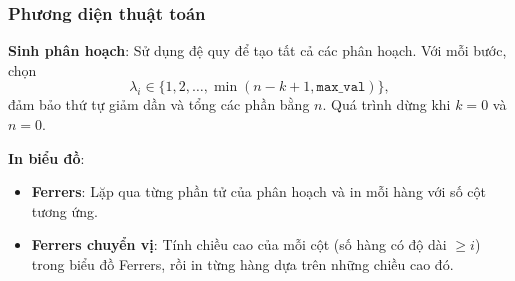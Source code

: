 \documentclass[a4paper,12pt]{article}
\begin{document}
\subsubsection{Phương diện thuật toán}
\textbf{Sinh phân hoạch}: Sử dụng đệ quy để tạo tất cả các phân hoạch. Với mỗi bước, chọn 
\[
  \lambda_i \in \{1, 2, \dots, \min(n - k + 1, \mathtt{max\_val})\},
\]
đảm bảo thứ tự giảm dần và tổng các phần bằng \(n\). Quá trình dừng khi \(k = 0\) và \(n = 0\).

\bigskip
\textbf{In biểu đồ}:
\begin{itemize}
  \item \textbf{Ferrers}: Lặp qua từng phần tử của phân hoạch và in mỗi hàng với số cột tương ứng.
  \item \textbf{Ferrers chuyển vị}: Tính chiều cao của mỗi cột (số hàng có độ dài \(\ge i\)) trong biểu đồ Ferrers, rồi in từng hàng dựa trên những chiều cao đó.
\end{itemize}
\end{document}
